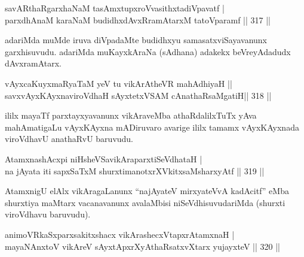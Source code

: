 \begin{shl}
savARthaRgarxhaNaM tasAmxtupxroVvasithxtadiVpavatf | \\
parxdhAnaM karaNaM budidhxdAvxRramAtarxM tatoV\s paramf \hfill||  317 || 
\end{shl}

\begin{artha}
adariMda muMde iruva diVpadaMte budidhxyu samasatxviSayavanunx garxhisuvudu. adariMda muKayxkAraNa (sAdhana) adakekx beVreyAdadudx dAvxramAtarx.
\end{artha}


\begin{shl}
vAyxcaKuyxmaRyaTaM yeV tu vikArAtheVR mahAdhiyaH ||  \\
\footnotemark[1]{}savxvAyxKAyxnaviroVdhaH sAyxtetxVSAM cAnathaRsaMgatiH\hfill ||  318 ||  
\end{shl}

\begin{artha}
ililx mayaTf parxtayxyavanunx vikAraveMba athaRdalilxTuTx yAva mahAmatigaLu vAyxKAyxna mADiruvaro avarige ililx tamamx vAyxKAyxnada viroVdhavU anathaRvU baruvudu.
\end{artha}

\begin{shl}
AtamxnashAcxpi niHsheVSavikAraparxtiSeVdhataH | \\
na jAyata iti sapxSaTxM shurxtimanotxrXVkitxsaMsharxyAtf \hfill||  319 ||  
\end{shl}

\begin{artha}
AtamxnigU elAlx vikAragaLanunx ``najAyateV mirxyateVvA kadAcitf'' eMba shurxtiya maMtarx vacanavanunx avalaMbisi niSeVdhisuvudariMda (shurxti viroVdhavu baruvudu).
\end{artha}

\begin{shl}
animoVRkaSxparxsakitxshacx vikArashecxVtapxrAtamxnaH | \\
mayaNAnxtoV vikAreV sAyxtApxrXyAthaRsatxvXtarx yujayxteV \hfill||  320 ||  
\end{shl}

